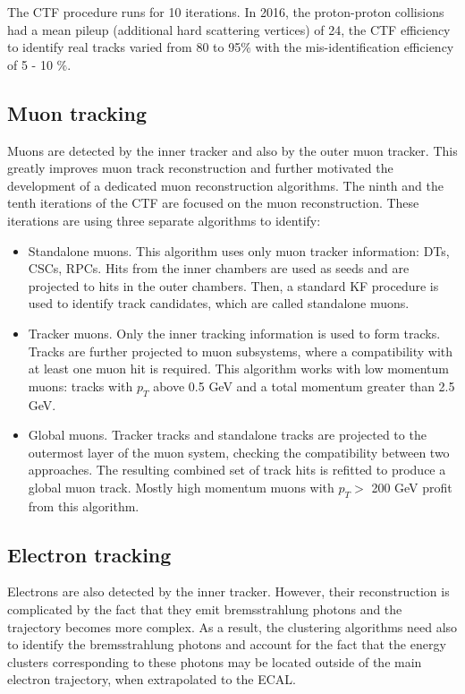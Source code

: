 The CTF procedure runs for 10 iterations. In 2016, the proton-proton collisions had a mean pileup (additional hard scattering vertices) of 24, the CTF efficiency to identify real tracks varied from 80 to 95$\%$ with the mis-identification efficiency of 5 - 10 $\%$.

\subsection{Muon tracking}\label{sec:muon_track_reconstruction}

Muons are detected by the inner tracker and also by the outer muon tracker. This greatly improves muon track reconstruction and further motivated the development of a dedicated muon reconstruction algorithms. The ninth and the tenth iterations of the CTF are focused on the muon reconstruction. These iterations are using three separate algorithms to identify: 

\begin{itemize}
\item Standalone muons. This algorithm uses only muon tracker information: DTs, CSCs, RPCs. Hits from the inner chambers are used as seeds and are projected to hits in the outer chambers. Then, a standard KF procedure is used to identify track candidates, which are called standalone muons.
\item Tracker muons. Only the inner tracking information is used to form tracks. Tracks are further projected to muon subsystems, where a compatibility with at least one muon hit is required. This algorithm works with low momentum muons: tracks with $p_T$ above 0.5 GeV and a total momentum greater than 2.5 GeV.
\item Global muons. Tracker tracks and standalone tracks are projected to the outermost layer of the muon system, checking the compatibility between two approaches. The resulting combined set of track hits is refitted to produce a global muon track. Mostly high momentum muons with $p_T > $ 200 GeV profit from this algorithm.
\end{itemize}

\subsection{Electron tracking}\label{sec:ele_track_reconstruction}
Electrons are also detected by the inner tracker. However, their reconstruction is complicated by the fact that they emit bremsstrahlung photons and the trajectory becomes more complex. As a result, the clustering algorithms need also to identify the bremsstrahlung photons and account for the fact that the energy clusters corresponding to these photons may be located outside of the main electron trajectory, when extrapolated to the ECAL. 

